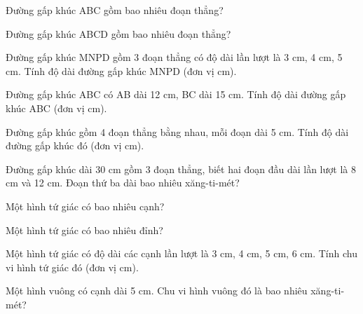 \begin{ex}
Đường gấp khúc ABC gồm bao nhiêu đoạn thẳng?
\end{ex}

\begin{ex}
Đường gấp khúc ABCD gồm bao nhiêu đoạn thẳng?
\end{ex}

\begin{ex}
Đường gấp khúc MNPD gồm 3 đoạn thẳng có độ dài lần lượt là 3 cm, 4 cm, 5 cm. Tính độ dài đường gấp khúc MNPD (đơn vị cm).
\end{ex}

\begin{ex}
Đường gấp khúc ABC có AB dài 12 cm, BC dài 15 cm. Tính độ dài đường gấp khúc ABC (đơn vị cm).
\end{ex}

\begin{ex}
Đường gấp khúc gồm 4 đoạn thẳng bằng nhau, mỗi đoạn dài 5 cm. Tính độ dài đường gấp khúc đó (đơn vị cm).
\end{ex}

\begin{ex}
Đường gấp khúc dài 30 cm gồm 3 đoạn thẳng, biết hai đoạn đầu dài lần lượt là 8 cm và 12 cm. Đoạn thứ ba dài bao nhiêu xăng-ti-mét?
\end{ex}

\begin{ex}
Một hình tứ giác có bao nhiêu cạnh?
\end{ex}

\begin{ex}
Một hình tứ giác có bao nhiêu đỉnh?
\end{ex}

\begin{ex}
Một hình tứ giác có độ dài các cạnh lần lượt là 3 cm, 4 cm, 5 cm, 6 cm. Tính chu vi hình tứ giác đó (đơn vị cm).
\end{ex}

\begin{ex}
Một hình vuông có cạnh dài 5 cm. Chu vi hình vuông đó là bao nhiêu xăng-ti-mét?
\end{ex}


